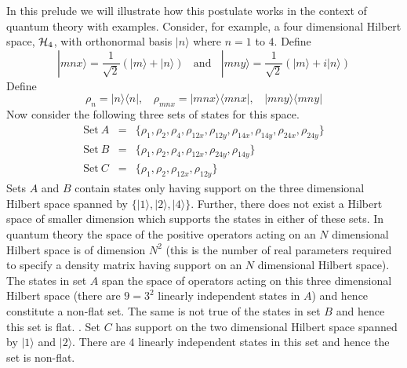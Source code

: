 \documentclass[10pt]{article}
\begin{document}
In this prelude we will illustrate how this postulate works in the context of quantum theory with examples. Consider, for example, a four dimensional Hilbert space, ${\cal H}_4$, with orthonormal basis $|n\rangle$ where $n=1$ to $4$.  Define
\begin{equation}
|mnx\rangle = \frac{1}{\sqrt{2}}(|m\rangle+|n\rangle) ~~~~\text{and}~~~~
|mny\rangle = \frac{1}{\sqrt{2}}(|m\rangle+i|n\rangle)
\end{equation}
Define
\begin{equation}
\rho_{n} = |n\rangle\langle n|, ~~~~ \rho_{mnx} = |mnx\rangle\langle mnx|, ~~~~|mny\rangle\langle mny|
\end{equation}
Now consider the following three sets of states for this space.
\begin{eqnarray}
\text{Set}~A &=& \{\rho_1, \rho_2, \rho_4, \rho_{12x}, \rho_{12y}, \rho_{14x}, \rho_{14y},  \rho_{24x}, \rho_{24y}\}  \\
\text{Set}~B &=& \{\rho_1, \rho_2, \rho_4, \rho_{12x}, \rho_{24y}, \rho_{14y}\} \\
\text{Set}~C &=& \{\rho_1, \rho_2, \rho_{12x}, \rho_{12y} \}
\end{eqnarray}
Sets $A$ and $B$ contain states only having support on the three dimensional Hilbert space spanned by $\{|1\rangle, |2\rangle, |4\rangle \}$.  Further, there does not exist a Hilbert space of smaller dimension which supports the states in either of these sets.  In quantum theory the space of the positive operators acting on an $N$ dimensional Hilbert space is of dimension $N^2$ (this is the number of real parameters required to specify a density matrix having support on an $N$ dimensional Hilbert space).  The states in set $A$ span the space of operators acting on this three dimensional Hilbert space (there are $9=3^2$ linearly independent states in $A$) and hence constitute a non-flat set. The same is not true of the states in set $B$ and hence this set is flat.  .   Set $C$ has support on the two dimensional Hilbert space spanned by $|1\rangle$ and $|2\rangle$.  There are $4$ linearly independent states in this set and hence the set is non-flat.
\end{document}
